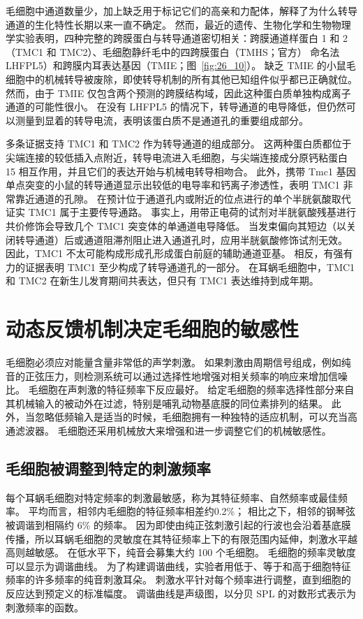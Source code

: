 毛细胞中通道数量少，加上缺乏用于标记它们的高亲和力配体，解释了为什么转导通道的生化特性长期以来一直不确定。
然而，最近的遗传、生物化学和生物物理学实验表明，四种完整的跨膜蛋白与转导通道密切相关：跨膜通道样蛋白 1 和 2（TMC1 和 TMC2）、毛细胞静纤毛中的四跨膜蛋白（TMHS；官方） 命名法 LHFPL5）和跨膜内耳表达基因（TMIE；图~\ref{fig:26_10}）。
缺乏 TMIE 的小鼠毛细胞中的机械转导被废除，即使转导机制的所有其他已知组件似乎都已正确就位。
然而，由于 TMIE 仅包含两个预测的跨膜结构域，因此这种蛋白质单独构成离子通道的可能性很小。
在没有 LHFPL5 的情况下，转导通道的电导降低，但仍然可以测量到显着的转导电流，表明该蛋白质不是通道孔的重要组成部分。


多条证据支持 TMC1 和 TMC2 作为转导通道的组成部分。
这两种蛋白质都位于尖端连接的较低插入点附近，转导电流进入毛细胞，与尖端连接成分原钙粘蛋白 15 相互作用，并且它们的表达开始与机械电转导相吻合。
此外，携带 Tmc1 基因单点突变的小鼠的转导通道显示出较低的电导率和钙离子渗透性，表明 TMC1 非常靠近通道的孔隙。
在预计位于通道孔内或附近的位点进行的单个半胱氨酸取代证实 TMC1 属于主要传导通路。
事实上，用带正电荷的试剂对半胱氨酸残基进行共价修饰会导致几个 TMC1 突变体的单通道电导降低。
当发束偏向其短边（以关闭转导通道）后或通道阻滞剂阻止进入通道孔时，应用半胱氨酸修饰试剂无效。 
因此，TMC1 不太可能构成形成孔形成蛋白前庭的辅助通道亚基。
相反，有强有力的证据表明 TMC1 至少构成了转导通道孔的一部分。
在耳蜗毛细胞中，TMC1 和 TMC2 在新生儿发育期间共表达，但只有 TMC1 表达维持到成年期。



\section{动态反馈机制决定毛细胞的敏感性}

毛细胞必须应对能量含量非常低的声学刺激。
如果刺激由周期信号组成，例如纯音的正弦压力，则检测系统可以通过选择性地增强对相关频率的响应来增加信噪比。
毛细胞在声刺激的特征频率下反应最好。
给定毛细胞的频率选择性部分来自其机械输入的被动外在过滤，特别是哺乳动物基底膜的同位素排列的结果。
此外，当忽略低频输入是适当的时候，毛细胞拥有一种独特的适应机制，可以充当高通滤波器。
毛细胞还采用机械放大来增强和进一步调整它们的机械敏感性。



\subsection{毛细胞被调整到特定的刺激频率}

每个耳蜗毛细胞对特定频率的刺激最敏感，称为其特征频率、自然频率或最佳频率。
平均而言，相邻内毛细胞的特征频率相差约0.2\%；
相比之下，相邻的钢琴弦被调谐到相隔约 6\% 的频率。 
因为即使由纯正弦刺激引起的行波也会沿着基底膜传播，所以耳蜗毛细胞的灵敏度在其特征频率上下的有限范围内延伸，刺激水平越高则越敏感。
在低水平下，纯音会募集大约 100 个毛细胞。
毛细胞的频率灵敏度可以显示为调谐曲线。
为了构建调谐曲线，实验者用低于、等于和高于细胞特征频率的许多频率的纯音刺激耳朵。
刺激水平针对每个频率进行调整，直到细胞的反应达到预定义的标准幅度。
调谐曲线是声级图，以分贝 SPL 的对数形式表示为刺激频率的函数。


